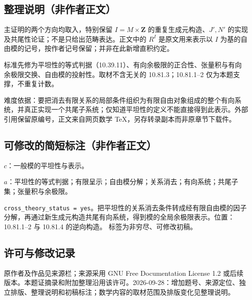 \documentclass[UTF8,11pt]{ctexart}
\theoremstyle{definition}
\begin{document}
\subsection*{整理说明（非作者正文）}
主证明的两个方向均取入，特别保留 $I=M\times\mathbf Z$ 的重复生成元构造、$J',N'$ 的实现及共尾性论证；不是只给出范畴表达。正文中的 $R^I$ 是原文用来表示以 $I$ 为基的自由模的记号，按作者记号保留；并非在此新增直积约定。

标准先修为平坦性的等式判据（10.39.11）、有向余极限的正合性、张量积与有向余极限交换、自由模的投射性。取材不含无关的 10.81.3；10.81.1--2 仅为本题支撑，不重复计数。

难度依据：要把消去有限关系的局部条件组织为有限自由对象组成的整个有向系统，并真正实现一个共尾子系统；仅知道平坦性的定义不能直接得到此表示。外部引用保留原编号，正文来自网页数学 TeX，另存转录副本而非原章节下载件。
\subsection*{可修改的简短标注（非作者正文）}
$c$：一般模的平坦性与表示。

$a$：平坦性的等式判据；有限呈示；自由模分解；关系消去；有向系统；共尾子集；张量积与余极限。

\texttt{cross\_theory\_status = yes}。把平坦性的关系消去条件转成经有限自由模的因子分解，再通过新生成元构造共尾有向系统，得到模的全局余极限表示。位置：10.81.1--2 与 10.81.4 的逆向构造。
标签为非穷尽、可修改初稿。
\subsection*{许可与修改记录}
原作者及作品见来源栏；来源采用 GNU Free Documentation License 1.2 或后续版本。本题证摘录和附加整理沿用该许可。2026-09-28：增加题号、来源定位、独立排版、整理说明和初稿标注；数学内容的取材范围及排版变化见整理说明。
\end{document}

